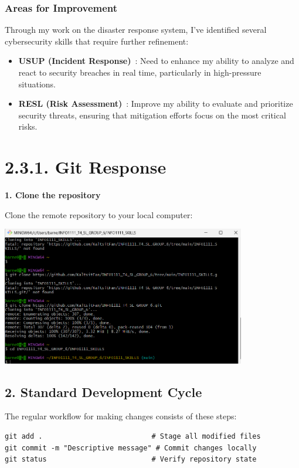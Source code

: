\documentclass[a4paper, 11pt]{report}
\begin{document}
\subsubsection{Areas for Improvement}  
Through my work on the disaster response system, I've identified several cybersecurity skills that require further refinement:
\begin{itemize}
    \item \textbf{USUP (Incident Response)}~\cite{incident_response}: Need to enhance my ability to analyze and react to security breaches in real time, particularly in high-pressure situations.
    \item \textbf{RESL (Risk Assessment)}~\cite{risk_assessment}: Improve my ability to evaluate and prioritize security threats, ensuring that mitigation efforts focus on the most critical risks.
\end{itemize}  

\newpage

\section*{2.3.1. Git Response}

\textbf{1. Clone the repository}

Clone the remote repository to your local computer:

\begin{center}
\includegraphics[width=0.8\textwidth]{BZ/1.png}
\end{center}

\subsection*{2. Standard Development Cycle}
The regular workflow for making changes consists of these steps:
\begin{verbatim}
git add .                          # Stage all modified files
git commit -m "Descriptive message" # Commit changes locally
git status                         # Verify repository state
\end{verbatim}
\end{document}
